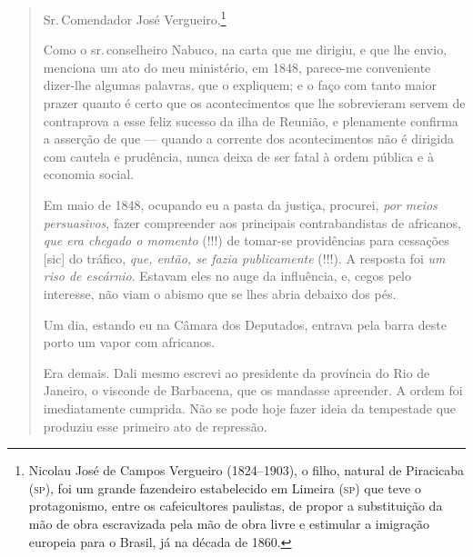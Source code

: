 \begin{quote}\label{vergueiro}
\noindent{}Sr.\,Comendador José Vergueiro,\footnote{Nicolau José de Campos 
  Vergueiro (1824--1903), o filho, natural de Piracicaba (\textsc{sp}), foi um
  grande fazendeiro estabelecido em Limeira (\textsc{sp}) que teve o
  protagonismo, entre os cafeicultores paulistas, de propor a
  substituição da mão de obra escravizada pela mão de obra livre e
  estimular a imigração europeia para o Brasil, já na década de 1860.}

Como o sr.\,conselheiro Nabuco, na carta que me dirigiu, e que lhe envio,
menciona um ato do meu ministério, em 1848, parece-me conveniente
dizer-lhe algumas palavras, que o expliquem; e o faço com tanto maior
prazer quanto é certo que os acontecimentos que lhe sobrevieram servem
de contraprova a esse feliz sucesso da ilha de Reunião, e plenamente
confirma a asserção de que --- quando a corrente dos acontecimentos não
é dirigida com cautela e prudência, nunca deixa de ser fatal à ordem
pública e à economia social.

Em maio de 1848, ocupando eu a pasta da justiça, procurei, \emph{por
meios persuasivos}, fazer compreender aos principais contrabandistas de
africanos, \emph{que era chegado o momento} (!!!) de tomar-se
providências para cessações {[}sic{]} do tráfico, \emph{que, então, se
fazia publicamente} (!!!). A resposta foi \textit{um riso de escárnio}. Estavam
eles no auge da influência, e, cegos pelo interesse, não viam o abismo
que se lhes abria debaixo dos pés.

Um dia, estando eu na Câmara dos Deputados, entrava pela barra deste
porto um vapor com africanos.

Era demais. Dali mesmo escrevi ao presidente da província do Rio de
Janeiro, o visconde de Barbacena, que os mandasse apreender. A ordem foi
imediatamente cumprida. Não se pode hoje fazer ideia da tempestade que
produziu esse primeiro ato de repressão.


\end{quote}

